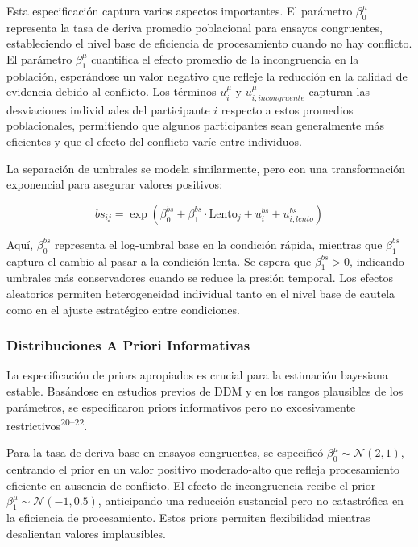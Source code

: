 \documentclass[
  spanish,
  10pt,
]{article}
\begin{document}
Esta especificación captura varios aspectos importantes. El parámetro
\(\beta_0^{\mu}\) representa la tasa de deriva promedio poblacional para
ensayos congruentes, estableciendo el nivel base de eficiencia de
procesamiento cuando no hay conflicto. El parámetro \(\beta_1^{\mu}\)
cuantifica el efecto promedio de la incongruencia en la población,
esperándose un valor negativo que refleje la reducción en la calidad de
evidencia debido al conflicto. Los términos \(u_i^{\mu}\) y
\(u_{i,incongruente}^{\mu}\) capturan las desviaciones individuales del
participante \(i\) respecto a estos promedios poblacionales, permitiendo
que algunos participantes sean generalmente más eficientes y que el
efecto del conflicto varíe entre individuos.

La separación de umbrales se modela similarmente, pero con una
transformación exponencial para asegurar valores positivos:

\[bs_{ij} = \exp(\beta_0^{bs} + \beta_1^{bs} \cdot \text{Lento}_{j} + u_i^{bs} + u_{i,lento}^{bs})\]

Aquí, \(\beta_0^{bs}\) representa el log-umbral base en la condición
rápida, mientras que \(\beta_1^{bs}\) captura el cambio al pasar a la
condición lenta. Se espera que \(\beta_1^{bs} > 0\), indicando umbrales
más conservadores cuando se reduce la presión temporal. Los efectos
aleatorios permiten heterogeneidad individual tanto en el nivel base de
cautela como en el ajuste estratégico entre condiciones.

\subsubsection{Distribuciones A Priori
Informativas}\label{distribuciones-a-priori-informativas}

La especificación de priors apropiados es crucial para la estimación
bayesiana estable. Basándose en estudios previos de DDM y en los rangos
plausibles de los parámetros, se especificaron priors informativos pero
no excesivamente restrictivos\textsuperscript{20--22}.

Para la tasa de deriva base en ensayos congruentes, se especificó
\(\beta_0^{\mu} \sim \mathcal{N}(2, 1)\), centrando el prior en un valor
positivo moderado-alto que refleja procesamiento eficiente en ausencia
de conflicto. El efecto de incongruencia recibe el prior
\(\beta_1^{\mu} \sim \mathcal{N}(-1, 0.5)\), anticipando una reducción
sustancial pero no catastrófica en la eficiencia de procesamiento. Estos
priors permiten flexibilidad mientras desalientan valores implausibles.
\end{document}

